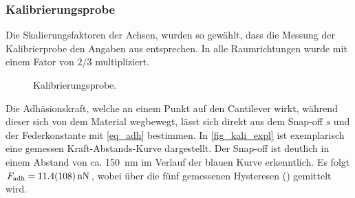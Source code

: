 \documentclass[
	a4paper,
	12pt,
	pagesize,
	ngerman
]{scrartcl}
\begin{document}
\subsubsection{Kalibrierungsprobe}\label{sss_kali} %
Die Skalierungsfaktoren der Achsen, wurden so gewählt, dass die Messung der Kalibrierprobe den Angaben aus \cite{Anleitung} entsprechen.
In alle Raumrichtungen wurde mit einem Fator von $2/3$ multipliziert.
\begin{figure}[H]
			\caption{Kalibrierungsprobe.}
\end{figure}
	Die Adhäsionskraft, welche an einem Punkt auf den Cantilever wirkt, während dieser sich von dem Material wegbewegt, lässt sich direkt aus dem Snap-off $s$ und der Federkonstante mit \cref{eq_adh} bestimmen.
	In \cref{fig_kali_expl} ist exemplarisch eine gemessen Kraft-Abstands-Kurve dargestellt.
	Der Snap-off ist deutlich in einem Abstand von ca. \SI{150}{nm} im Verlauf der blauen Kurve erkenntlich.
		Es folgt $F_\text{adh}=\SI{11.4+-10.8}{nN}$, wobei über die fünf gemessenen Hysteresen () gemittelt wird.
\end{document}
